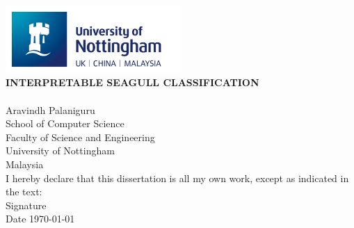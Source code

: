 \documentclass[a4paper,12pt]{report}
\begin{document}
\newpage
\begin{titlepage}
    \begin{center}
        \vspace{0.1em}
        \includegraphics[width=0.5\textwidth]{images/nottingham_logo.png}\\[6em]

        \textbf{INTERPRETABLE SEAGULL CLASSIFICATION}\\[6em]

        \\[4em]

        Aravindh Palaniguru\\
        School of Computer Science\\
        Faculty of Science and Engineering\\
        University of Nottingham\\
        Malaysia\\[6em]

        I hereby declare that this dissertation is all my own work, except as indicated in the text:\\[4em]

        Signature \\[2em]
        Date \hspace{1cm} \today            
    \end{center}
\end{titlepage}

\end{document}
